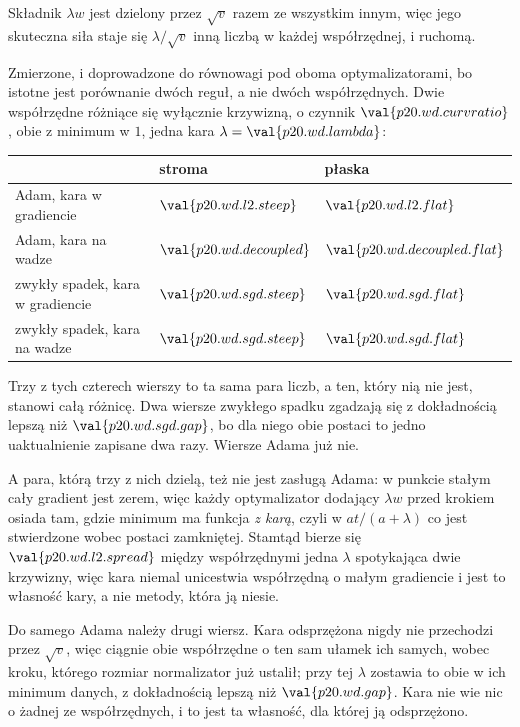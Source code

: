 \begin{fr}
\begin{ansblock}
Składnik $\lambda w$ jest dzielony przez $\sqrt{v}$ razem ze wszystkim innym,
więc jego skuteczna siła staje się $\lambda/\sqrt{v}$ \dash{} inną liczbą w
każdej współrzędnej, i ruchomą.
\end{ansblock}

Zmierzone, i doprowadzone do równowagi pod oboma optymalizatorami, bo istotne
jest porównanie dwóch reguł, a nie dwóch współrzędnych. Dwie współrzędne
różniące się wyłącznie krzywizną, o czynnik
$\val{p20.wd.curvratio}$, obie z minimum w $1$, jedna kara
$\lambda = \val{p20.wd.lambda}$:

\begin{center}
\begin{tabular}{lll}
\toprule
& stroma & płaska \\
\midrule
Adam, kara w gradiencie & $\val{p20.wd.l2.steep}$ & $\val{p20.wd.l2.flat}$ \\
Adam, kara na wadze & $\val{p20.wd.decoupled}$ & $\val{p20.wd.decoupled.flat}$ \\
zwykły spadek, kara w gradiencie & $\val{p20.wd.sgd.steep}$ & $\val{p20.wd.sgd.flat}$ \\
zwykły spadek, kara na wadze & $\val{p20.wd.sgd.steep}$ & $\val{p20.wd.sgd.flat}$ \\
\bottomrule
\end{tabular}
\end{center}

Trzy z tych czterech wierszy to ta sama para liczb, a ten, który nią nie jest,
stanowi całą różnicę. Dwa wiersze zwykłego spadku zgadzają się z dokładnością
lepszą niż $\val{p20.wd.sgd.gap}$, bo dla niego obie postaci to jedno
uaktualnienie zapisane dwa razy. Wiersze Adama już nie.

A para, którą trzy z nich dzielą, też nie jest zasługą Adama: w punkcie stałym
cały gradient jest zerem, więc każdy optymalizator dodający $\lambda w$ przed
krokiem osiada tam, gdzie minimum ma funkcja \emph{z karą}, czyli w
$at/(a+\lambda)$ \dash{} co jest stwierdzone wobec postaci zamkniętej. Stamtąd
bierze się $\val{p20.wd.l2.spread}$ między współrzędnymi \dash{} jedna
$\lambda$ spotykająca dwie krzywizny, więc kara niemal unicestwia współrzędną
o małym gradiencie \dash{} i jest to własność kary, a nie metody, która ją
niesie.

Do samego Adama należy drugi wiersz. Kara
odsprzężona%
 nigdy nie przechodzi
przez $\sqrt{v}$, więc ciągnie obie współrzędne o ten sam ułamek ich samych,
wobec kroku, którego rozmiar normalizator już ustalił; przy tej $\lambda$
zostawia to obie w ich minimum danych, z dokładnością lepszą niż
$\val{p20.wd.gap}$. Kara nie wie nic o żadnej ze współrzędnych, i to jest ta
własność, dla której ją odsprzężono.
\end{fr}

